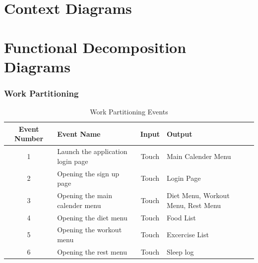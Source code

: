 \documentclass[12pt,letterpaper]{article}
\begin{document}
\section{Context Diagrams}

\section{Functional Decomposition Diagrams}

\subsubsection{Work Partitioning}
\begin{table}[h!]
\caption{Work Partitioning Events}
    \centering
    \begin{tabular}{|c|p{3.5cm}|c|p{3.5cm}|}
    \hline
    \textbf{Event Number} & \centering\textbf{Event Name} & \textbf{Input} & \textbf{Output} \\
    \hline
    1 & Launch the application login page & Touch & Main Calender Menu \\
    \hline
    2 & Opening the sign up page & Touch & Login Page \\
    \hline
    3 & Opening the main calender menu & Touch & Diet Menu, Workout Menu, Rest Menu \\
    \hline
    4 & Opening the diet menu  & Touch & Food List \\
    \hline
    5 & Opening the workout menu & Touch & Excercise List \\
    \hline
    6 & Opening the rest menu & Touch & Sleep log \\
    \hline
    \end{tabular}
\end{table}
\end{document}
